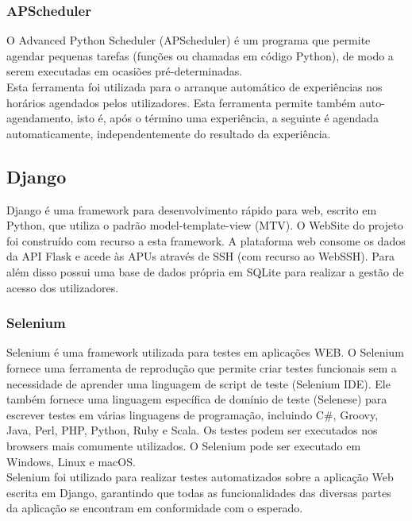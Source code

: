 \subsubsection{APScheduler}
O Advanced Python Scheduler (APScheduler) é um programa que permite agendar pequenas tarefas (funções ou chamadas em código Python), de modo a serem executadas em ocasiões pré-determinadas.\cite{apscheduler}\newline\\
Esta ferramenta foi utilizada para o arranque automático de experiências nos horários agendados pelos utilizadores. Esta ferramenta permite também auto-agendamento, isto é, após o término uma experiência, a seguinte é agendada automaticamente, independentemente do resultado da experiência.

\subsection{Django}
Django é uma framework para desenvolvimento rápido para web, escrito em Python, que utiliza o padrão model-template-view (MTV).\cite{django}\newline
O WebSite do projeto foi construído com recurso a esta framework. A plataforma web  consome os dados da API Flask e acede às APUs através de SSH (com recurso ao WebSSH). Para além disso possui uma  base de dados própria em SQLite para realizar a gestão de acesso dos utilizadores.


\subsubsection{Selenium}
Selenium é uma framework utilizada para testes em aplicações WEB. O Selenium fornece uma ferramenta de reprodução que permite criar testes funcionais sem a necessidade de aprender uma linguagem de script de teste (Selenium IDE). Ele também fornece uma linguagem específica de domínio de teste (Selenese) para escrever testes em várias linguagens de programação, incluindo C\#, Groovy, Java, Perl, PHP, Python, Ruby e Scala. Os testes podem ser executados nos browsers mais comumente utilizados. O Selenium pode ser executado em Windows, Linux e macOS.\cite{selenium}\newline\\
Selenium foi utilizado para realizar testes automatizados sobre a aplicação Web escrita em Django, garantindo que todas as funcionalidades das diversas partes da aplicação se encontram em conformidade com o esperado.

